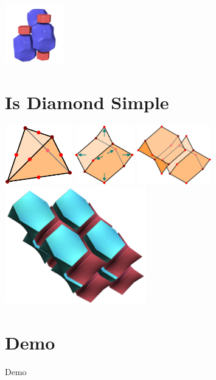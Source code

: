 \documentclass{beamer}
\begin{document}
\begin{frame}
\begin{center}
    \includegraphics[width=1.0in]{simple9}
  \end{center}
\end{frame}


\section{Is Diamond Simple}

\begin{frame}
  \begin{center}
    \includegraphics[height=1.0in]{extetra1}
    \hspace{2mm}
    \includegraphics[height=1.0in]{extetra2}
    \hspace{2mm}
    \includegraphics[height=1.0in]{extetra3}\\[2mm]
    \includegraphics[height=2.0in]{diamond-tiling}
  \end{center}
\end{frame}


\section{Demo}

\begin{frame}
  \begin{center}
    Demo
  \end{center}
\end{frame}
\end{document}
